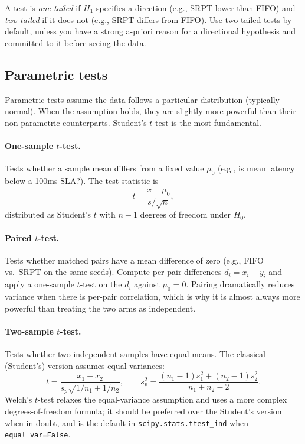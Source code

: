 \documentclass[11pt]{article}
\begin{document}
A test is \emph{one-tailed} if $H_1$ specifies a direction (e.g., SRPT lower than FIFO) and \emph{two-tailed} if it does not (e.g., SRPT differs from FIFO). Use two-tailed tests by default, unless you have a strong a-priori reason for a directional hypothesis and committed to it before seeing the data.

\subsection{Parametric tests}
\label{sec:parametric}

Parametric tests assume the data follows a particular distribution (typically normal). When the assumption holds, they are slightly more powerful than their non-parametric counterparts. Student's $t$-test is the most fundamental.

\paragraph{One-sample $t$-test.} Tests whether a sample mean differs from a fixed value $\mu_0$ (e.g., is mean latency below a 100ms SLA?). The test statistic is
\begin{equation}
t = \frac{\bar{x} - \mu_0}{s / \sqrt{n}},
\end{equation}
distributed as Student's $t$ with $n-1$ degrees of freedom under $H_0$.

\paragraph{Paired $t$-test.} Tests whether matched pairs have a mean difference of zero (e.g., FIFO vs.\ SRPT on the same seeds). Compute per-pair differences $d_i = x_i - y_i$ and apply a one-sample $t$-test on the $d_i$ against $\mu_0 = 0$. Pairing dramatically reduces variance when there is per-pair correlation, which is why it is almost always more powerful than treating the two arms as independent.

\paragraph{Two-sample $t$-test.} Tests whether two independent samples have equal means. The classical (Student's) version assumes equal variances:
\begin{equation}
t = \frac{\bar{x}_1 - \bar{x}_2}{s_p \sqrt{1/n_1 + 1/n_2}}, \qquad s_p^2 = \frac{(n_1-1) s_1^2 + (n_2-1) s_2^2}{n_1 + n_2 - 2}.
\end{equation}
Welch's $t$-test relaxes the equal-variance assumption and uses a more complex degrees-of-freedom formula; it should be preferred over the Student's version when in doubt, and is the default in \texttt{scipy.stats.ttest\_ind} when \texttt{equal\_var=False}.
\end{document}
